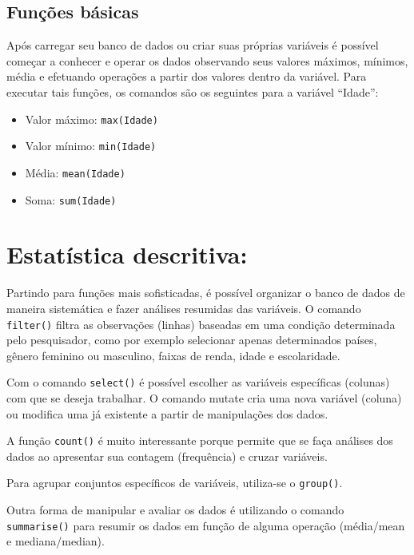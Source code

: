 \documentclass[
  brazil,
]{book}
\providecommand{\tightlist}{%
  \setlength{\itemsep}{0pt}\setlength{\parskip}{0pt}}
\begin{document}
\hypertarget{funuxe7uxf5es-buxe1sicas}{%
\subsection{Funções básicas}\label{funuxe7uxf5es-buxe1sicas}}

Após carregar seu banco de dados ou criar suas próprias variáveis é possível começar a conhecer e operar os dados observando seus valores máximos, mínimos, média e efetuando operações a partir dos valores dentro da variável. Para executar tais funções, os comandos são os seguintes para a variável ``Idade'':

\begin{itemize}
\tightlist
\item
  Valor máximo: \texttt{max(Idade)}
\item
  Valor mínimo: \texttt{min(Idade)}
\item
  Média: \texttt{mean(Idade)}
\item
  Soma: \texttt{sum(Idade)}
\end{itemize}

\hypertarget{estatuxedstica-descritiva}{%
\section{Estatística descritiva:}\label{estatuxedstica-descritiva}}

Partindo para funções mais sofisticadas, é possível organizar o banco de dados de maneira sistemática e fazer análises resumidas das variáveis. O comando \texttt{filter()} filtra as observações (linhas) baseadas em uma condição determinada pelo pesquisador, como por exemplo selecionar apenas determinados países, gênero feminino ou masculino, faixas de renda, idade e escolaridade.

Com o comando \texttt{select()} é possível escolher as variáveis específicas (colunas) com que se deseja trabalhar. O comando mutate cria uma nova variável (coluna) ou modifica uma já existente a partir de manipulações dos dados.

A função \texttt{count()} é muito interessante porque permite que se faça análises dos dados ao apresentar sua contagem (frequência) e cruzar variáveis.

Para agrupar conjuntos específicos de variáveis, utiliza-se o \texttt{group()}.

Outra forma de manipular e avaliar os dados é utilizando o comando \texttt{summarise()} para resumir os dados em função de alguma operação (média/mean e mediana/median).
\end{document}
